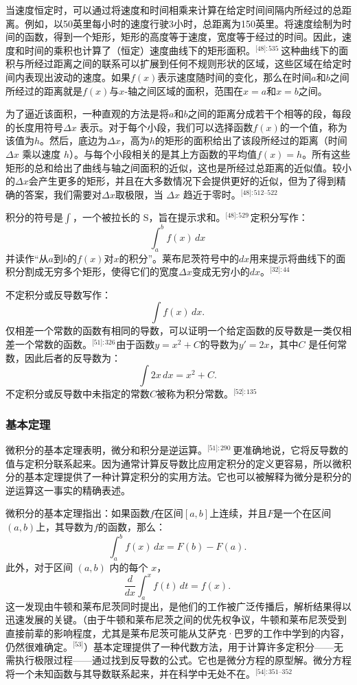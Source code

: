当速度恒定时，可以通过将速度和时间相乘来计算在给定时间间隔内所经过的总距离。例如，以50英里每小时的速度行驶3小时，总距离为150英里。将速度绘制为时间的函数，得到一个矩形，矩形的高度等于速度，宽度等于经过的时间。因此，速度和时间的乘积也计算了（恒定）速度曲线下的矩形面积。\(^\text{[48]: 535  }\) 这种曲线下的面积与所经过距离之间的联系可以扩展到任何不规则形状的区域，这些区域在给定时间内表现出波动的速度。如果\(f(x)\)表示速度随时间的变化，那么在时间\(a\)和\(b\)之间所经过的距离就是\(f(x)\)与\(x\)-轴之间区域的面积，范围在\(x = a\)和\(x = b\)之间。

为了逼近该面积，一种直观的方法是将\(a\)和\(b\)之间的距离分成若干个相等的段，每段的长度用符号\(\Delta x\) 表示。对于每个小段，我们可以选择函数\(f(x)\)的一个值，称为该值为\(h\)。然后，底边为\(\Delta x\)，高为\(h\)的矩形的面积给出了该段所经过的距离（时间 \(\Delta x\) 乘以速度 \(h\)）。与每个小段相关的是其上方函数的平均值\(f(x) = h\)。所有这些矩形的总和给出了曲线与轴之间面积的近似，这也是所经过总距离的近似值。较小的\(\Delta x\)会产生更多的矩形，并且在大多数情况下会提供更好的近似，但为了得到精确的答案，我们需要对\(\Delta x\)取极限，当 \(\Delta x\) 趋近于零时。\(^\text{[48]: 512–522  }\) 

积分的符号是\(\int\)，一个被拉长的 S，旨在提示求和。\(^\text{[48]: 529  }\)定积分写作：
\[
\int_{a}^{b} f(x)\, dx~
\]
并读作“从\(a\)到\(b\)的\(f(x)\)对\(x\)的积分”。莱布尼茨符号中的\(dx\)用来提示将曲线下的面积分割成无穷多个矩形，使得它们的宽度\(\Delta x\)变成无穷小的\(dx\)。\(^\text{[32]: 44}\)

不定积分或反导数写作：
\[
\int f(x)\, dx.~
\]
仅相差一个常数的函数有相同的导数，可以证明一个给定函数的反导数是一类仅相差一个常数的函数。\(^\text{[51]: 326}\) 由于函数\(y = x^2 + C\)的导数为\(y' = 2x\)，其中\(C\) 是任何常数，因此后者的反导数为：
\[
\int 2x\, dx = x^2 + C.~
\]
不定积分或反导数中未指定的常数\(C\)被称为积分常数。\(^\text{[52]: 135 }\) 
\subsubsection{基本定理}  
微积分的基本定理表明，微分和积分是逆运算。\(^\text{[51]: 290 }\)  更准确地说，它将反导数的值与定积分联系起来。因为通常计算反导数比应用定积分的定义更容易，所以微积分的基本定理提供了一种计算定积分的实用方法。它也可以被解释为微分是积分的逆运算这一事实的精确表述。

微积分的基本定理指出：如果函数\(f\)在区间\([a, b]\)上连续，并且\(F\)是一个在区间\((a, b)\)上，其导数为\(f\)的函数，那么：
\[
\int_{a}^{b} f(x)\, dx = F(b) - F(a).~
\]
此外，对于区间 \((a, b)\) 内的每个 \(x\)，
\[
\frac{d}{dx} \int_{a}^{x} f(t)\, dt = f(x).~
\]
这一发现由牛顿和莱布尼茨同时提出，是他们的工作被广泛传播后，解析结果得以迅速发展的关键。（由于牛顿和莱布尼茨之间的优先权争议，牛顿和莱布尼茨受到直接前辈的影响程度，尤其是莱布尼茨可能从艾萨克·巴罗的工作中学到的内容，仍然很难确定。\(^\text{[53]}\)）基本定理提供了一种代数方法，用于计算许多定积分——无需执行极限过程——通过找到反导数的公式。它也是微分方程的原型解。微分方程将一个未知函数与其导数联系起来，并在科学中无处不在。\(^\text{[54]: 351–352 }\)
